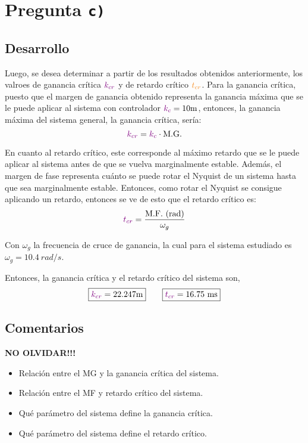 \section{Pregunta \texttt{c)}}\label{pregunta-c}

\subsection{Desarrollo}

Luego, se desea determinar a partir de los resultados obtenidos anteriormente,
los valroes de ganancia crítica $\mathbin{\color{violet}k_{cr}}$ y de retardo crítico $\nara{t_{cr}}$.
Para la ganancia crítica, puesto que el margen de ganancia obtenido representa
la ganancia máxima que se le puede aplicar al sistema con controlador $\mora{k_{c}} = 10\unit{m}$,
entonces, la ganancia máxima del sistema general, la ganancia crítica, sería:
\begin{equation}
  \mathbin{\color{violet}k_{cr}} = \mathbin{\color{violet}k_{c}} \cdot \text{M.G.}
\end{equation}

En cuanto al retardo crítico, este corresponde al máximo retardo que se le
puede aplicar al sistema antes de que se vuelva marginalmente estable. Además,
el margen de fase representa cuánto se puede rotar el Nyquist de un sistema
hasta que sea marginalmente estable. Entonces, como rotar el Nyquist se consigue
aplicando un retardo, entonces se ve de esto que el retardo crítico es:
\begin{equation}
  \mora{t_{cr}} = \frac{\te{M.F.}\ \te{(rad)}}{\omega_{g}}
\end{equation}

Con $\omega_{g}$ la frecuencia de cruce de ganancia, la cual para el sistema
estudiado es $\omega_{g} = 10.4\ \unit{rad/s}$.

Entonces, la ganancia crítica y el retardo crítico del sistema son,
\begin{equation}
  \boxed{\mora{k_{cr}} = 22.247\unit{m}} \qquad \boxed{\mora{t_{cr}} = 16.75\ \unit{ms}}
\end{equation}


\FloatBarrier
\subsection{Comentarios}

\textbf{NO OLVIDAR!!!}


\begin{itemize}
  \item Relación entre el MG y la ganancia crítica del sistema.
  \item Relación entre el MF y retardo crítico del sistema.
  \item Qué parámetro del sistema define la ganancia crítica.
  \item Qué parámetro del sistema define el retardo crítico.
\end{itemize}
